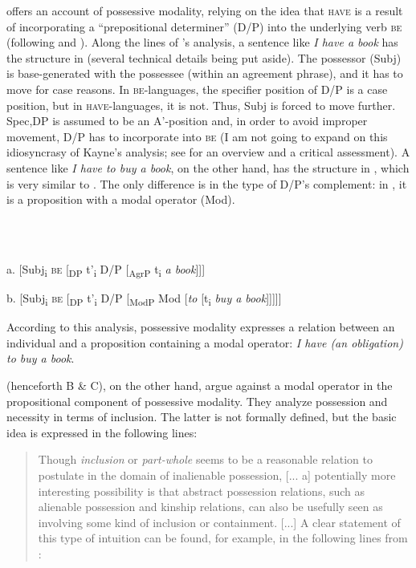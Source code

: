 \documentclass[output=paper,colorlinks,citecolor=brown]{./langscibook}
\begin{document}
\citet{Bhatt1997} offers an account of possessive modality, relying on the idea that \textsc{have} is a result of incorporating a “prepositional determiner” (D/P) into the underlying verb \textsc{be} (following \citealt{Freeze1992} and \citealt{Kayne1993}). Along the lines of \citeauthor{Kayne1993}’s analysis, a sentence like \textit{I have a book} has the structure in  (several technical details being put aside). The possessor (Subj) is base-generated with the possessee (within an agreement phrase), and it has to move for case reasons. In \textsc{be}{}-languages, the specifier position of D/P is a case position, but in \textsc{have-}languages, it is not. Thus, Subj is forced to move further. Spec,DP is assumed to be an A'{}-position and, in order to avoid improper movement, D/P has to incorporate into \textsc{be} (I am not going to expand on this idiosyncrasy of Kayne’s analysis; see \citet[320–328]{Myler2016} for an overview and a critical assessment). A sentence like \textit{I have to buy a book}, on the other hand, has the structure in , which is very similar to . The only difference is in the type of D/P’s complement: in , it is a proposition with a modal operator (Mod). 

\ea%
    \label{ex:tsedryk:2}
    \gll\\
        \\
    \glt
    \z

          a.  [Subj\textsubscript{i} \textsc{be} [\textsubscript{DP} t'\textsubscript{i} D/P [\textsubscript{AgrP} t\textsubscript{i} \textit{a book}]]]

  b.  [Subj\textsubscript{i} \textsc{be} [\textsubscript{DP} t'\textsubscript{i} D/P [\textsubscript{ModP} Mod [\textit{to} [t\textsubscript{i} \textit{buy a book}]]]]]

According to this analysis, possessive modality expresses a relation between an individual and a proposition containing a modal operator: \textit{I have (an obligation) to buy a book}. 

\citet{BjorkmanCowper2016} (henceforth B \& C), on the other hand, argue against a modal operator in the propositional component of possessive modality. They analyze possession and necessity in terms of inclusion. The latter is not formally defined, but the basic idea is expressed in the following lines:

\begin{quote}
Though \textit{inclusion} or \textit{part-whole} seems to be a reasonable relation to postulate in the domain of inalienable possession, [... a] potentially more interesting possibility is that abstract possession relations, such as alienable possession and kinship relations, can also be usefully seen as involving some kind of inclusion or containment. [...] A clear statement of this type of intuition can be found, for example, in the following lines from \citet{BonehSichel2010}: 
\end{quote}
\end{document}
